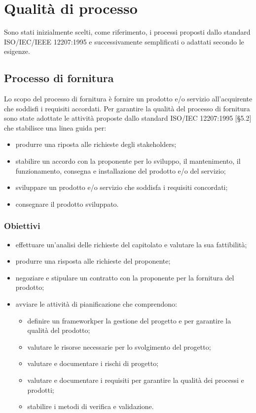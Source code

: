 \section{Qualità di processo}
Sono stati inizialmente scelti, come riferimento, i processi proposti dallo standard ISO/IEC/IEEE 12207:1995 e successivamente semplificati o adattati secondo le esigenze.

	\subsection{Processo di fornitura}
	Lo scopo del processo di fornitura è fornire un prodotto e/o servizio all'acquirente che soddisfi i requisiti accordati.
	Per garantire la qualità del processo di fornitura sono state adottate le attività proposte dallo standard ISO/IEC 12207:1995 [§5.2] che stabilisce una linea guida per:
	\begin{itemize}
		\item produrre una riposta alle richieste degli stakeholders\glo ;
		\item stabilire un accordo con la proponente per lo sviluppo, il mantenimento, il funzionamento, consegna e installazione del prodotto e/o del servizio;
		\item sviluppare un prodotto e/o servizio che soddisfa i requisiti concordati;
		\item consegnare il prodotto sviluppato.
	\end{itemize}
	\subsubsection{Obiettivi}
	\begin{itemize}
		\item effettuare un'analisi delle richieste del capitolato e valutare la sua fattibilità;
		\item produrre una risposta alle richieste del proponente;
		\item negoziare e stipulare un contratto con la proponente per la fornitura del prodotto;
		\item avviare le attività di pianificazione che comprendono:
			\begin{itemize}
				\item definire un framework\glosp per la gestione del progetto e per garantire la qualità del prodotto;
				\item valutare le risorse necessarie per lo svolgimento del progetto;
				\item valutare e documentare i rischi di progetto;
				\item valutare e documentare i requisiti per garantire la qualità dei processi e prodotti;
				\item stabilire i metodi di verifica e validazione.
			\end{itemize}
	\end{itemize}
